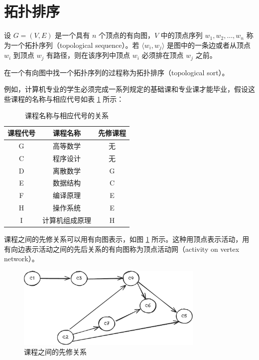 \documentclass[lang=cn,newtx,10pt,scheme=chinese]{../elegantbook}
\begin{document}
\section{拓扑排序}

设 $G = (V, E)$ 是一个具有 $n$ 个顶点的有向图，$V$ 中的顶点序列 $w_1, w_2, \dots, w_n$ 称为一个拓扑序列（topological sequence）。若 $\langle w_i, w_j \rangle$ 是图中的一条边或者从顶点 $w_i$ 到顶点 $w_j$ 有路径，则在该序列中顶点 $w_i$ 必须排在顶点 $w_j$ 之前。

在一个有向图中找一个拓扑序列的过程称为拓扑排序（topological sort）。

例如，计算机专业的学生必须完成一系列规定的基础课和专业课才能毕业，假设这些课程的名称与相应代号如表 \ref{tab:course} 所示：

\begin{table}[!htbp]
  \centering
  \caption{课程名称与相应代号的关系}
  \label{tab:course}
  \begin{tabular}{|c|c|c|}
    \hline
    课程代号 & 课程名称 & 先修课程 \\ \hline
    G & 高等数学 & 无 \\ \hline
    C & 程序设计 & 无 \\ \hline
    D & 离散数学 & G \\ \hline
    E & 数据结构 & C \\ \hline
    F & 编译原理 & E \\ \hline
    H & 操作系统 & E \\ \hline
    I & 计算机组成原理 & H \\ \hline
  \end{tabular}
\end{table}

课程之间的先修关系可以用有向图表示，如图 \ref{fig:course} 所示。这种用顶点表示活动，用有向边表示活动之间的先后关系的有向图称为顶点活动网（activity on vertex network）。

\begin{figure}[!htbp]
  \centering
  \includegraphics[width=0.8\textwidth]{./figure/pdf/cropped/toposort.pdf}
  \caption{课程之间的先修关系}
  \label{fig:course}
\end{figure}
\end{document}
